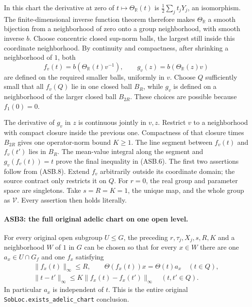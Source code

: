 In this chart the derivative at zero of
\(t\mapsto\Theta_{\mathbb R}(t)\) is
\(\frac12\sum_jt_jY_j\), an isomorphism.
The finite-dimensional inverse function theorem therefore makes
\(\Theta_{\mathbb R}\) a smooth bijection from a neighborhood of
zero onto a group neighborhood, with smooth inverse \(b\).
Choose concentric closed sup-norm balls, the largest still inside
this coordinate neighborhood.  By continuity and compactness,
after shrinking a neighborhood of \(1\), both
\[
 f_v(t)=b(\Theta_{\mathbb R}(t)v^{-1}),\qquad
 g_v(z)=b(\Theta_{\mathbb R}(z)v)
 \tag{ASB.8}
\]
are defined on the required smaller balls, uniformly in \(v\).
Choose \(Q\) sufficiently small that all \(f_v(Q)\) lie in one
closed ball \(B_R\), while \(g_v\) is defined on a neighborhood of
the larger closed ball \(B_{2R}\).
These choices are possible because \(f_1(0)=0\).

The derivative of \(g_v\) in \(z\) is continuous jointly in \(v,z\).
Restrict \(v\) to a neighborhood with compact closure inside the
previous one.  Compactness of that closure times \(B_{2R}\)
gives one operator-norm bound \(K\ge1\).
The line segment between \(f_v(t)\) and \(f_v(t')\) lies in
\(B_R\).  The mean-value integral along the segment and
\(g_v(f_v(t))=t\) prove the final inequality in (ASB.6).
The first two assertions follow from (ASB.8).
Extend \(f_v\) arbitrarily outside its coordinate domain; the
source contract only restricts it on \(Q\).
For \(r=0\), the real group and parameter space are singletons.
Take \(s=R=K=1\), the unique map, and the whole group as
\(\mathcal V\).  Every assertion then holds literally.

\paragraph{ASB3: the full original adelic chart on one open level.}
\label{claim:ASB3}
For every original open subgroup \(U\le G\), the preceding
\(r,\tau_j,X_j,s,R,K\) and a neighborhood \(W\) of \(1\) in \(G\)
can be chosen so that for every \(x\in W\) there are
one \(a_x\in U\cap G_f\) and one \(f_x\) satisfying
\[
 \begin{gathered}
 \|\!f_x(t)\!\|_\infty\le R,\qquad
             \Theta(f_x(t))x=\Theta(t)a_x\quad(t\in Q),\\
 \|t-t'\|_\infty\le K\|f_x(t)-f_x(t')\|_\infty
                       \quad(t,t'\in Q).
 \end{gathered}
 \tag{ASB.9}
\]
In particular \(a_x\) is independent of \(t\).  This is the entire
original \texttt{SobLoc.exists\_adelic\_chart} conclusion.

